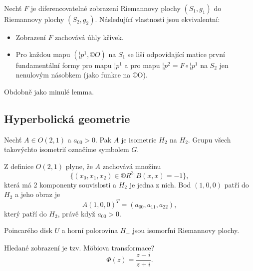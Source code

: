 \documentclass[12pt]{article}                   %
\begin{document}
        \begin{lemma}
            Nechť $F$ je diferencovatelné zobrazení Riemannovy plochy $(S_1, g_1)$ do Riemannovy plochy $(S_2, g_2)$. Následující vlastnosti jsou ekvivalentní:

            \begin{itemize}
                \item Zobrazení $F$ zachovává úhly křivek.
                \item Pro každou mapu $(¦p^1, ©O)$ na $S_1$ se liší odpovídající matice první fundamentální formy pro mapu $¦p^1$ a pro mapu $¦p^2 = F \circ ¦p^1$ na $S_2$ jen nenulovým násobkem (jako funkce na ©O).
            \end{itemize}

            \begin{dukazin}
                Obdobně jako minulé lemma.
            \end{dukazin}
        \end{lemma}

    \subsection{Hyperbolická geometrie}
        \begin{lemma}
            Nechť $A \in O(2, 1)$ a $a_{00}>0$. Pak $A$ je isometrie $H_2$ na $H_2$. Grupu všech takovýchto isometrií označíme symbolem $G$.

            \begin{dukazin}
                Z definice $O(2, 1)$ plyne, že $A$ zachovává množinu
                $$ \{(x_0, x_1, x_2) \in ®R^3 | B(x, x) = -1\}, $$
                která má 2 komponenty souvislosti a $H_2$ je jedna z nich. Bod $(1, 0, 0)$ patří do $H_2$ a jeho obraz je
                $$ A(1, 0, 0)^T = (a_{00}, a_{11}, a_{22}), $$
                který patří do $H_2$, právě když $a_{00} > 0$.
            \end{dukazin}
        \end{lemma}

        \begin{lemma}
            Poincarého disk $U$ a horní polorovina $H_+$ jsou isomorfní Riemannovy plochy.

            \begin{dukazin}
                Hledané zobrazení je tzv. Möbiova transformace?
                $$ \Phi(z) = \frac{z-i}{z+i}. $$ 
            \end{dukazin}
        \end{lemma}
\end{document}
